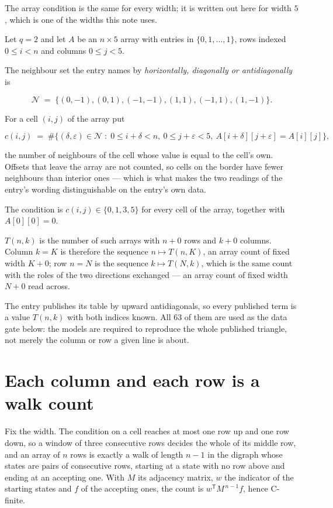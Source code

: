 \documentclass[11pt]{article}
\theoremstyle{definition}
\begin{document}
The array condition is the same for every width; it is written out here for width $5$, which is one of the widths this note uses.

Let $q = 2$ and let $A$ be an $n \times 5$ array with entries in $\{0,1,\dots,1\}$, rows indexed $0 \le i < n$ and columns $0 \le j < 5$.

The neighbour set the entry names by {\itshape horizontally, diagonally or antidiagonally} is

\[\mathcal{N} \;=\; \{(0,-1), (0,1), (-1,-1), (1,1), (-1,1), (1,-1)\}.\]

For a cell $(i,j)$ of the array put

\[c(i,j) \;=\; \#\bigl\{(\delta,\varepsilon)\in\mathcal{N} \;:\; 0\le i+\delta<n,\ 0\le j+\varepsilon<5,\ A[i+\delta][j+\varepsilon] = A[i][j]\bigr\},\]

the number of neighbours of the cell whose value is equal to the cell's own. Offsets that leave the array are not counted, so cells on the border have fewer neighbours than interior ones --- which is what makes the two readings of the entry's wording distinguishable on the entry's own data.

The condition is $c(i,j) \in \{0, 1, 3, 5\}$ for every cell of the array, together with $A[0][0]=0$.

$T(n,k)$ is the number of such arrays with $n + 0$ rows and $k + 0$ columns. Column $k = K$ is therefore the sequence $n \mapsto T(n,K)$, an array count of fixed width $K + 0$; row $n = N$ is the sequence $k \mapsto T(N,k)$, which is the same count with the roles of the two directions exchanged --- an array count of fixed width $N + 0$ read across.

The entry publishes its table by upward antidiagonals, so every published term is a value $T(n,k)$ with both indices known. All 63 of them are used as the data gate below: the models are required to reproduce the whole published triangle, not merely the column or row a given line is about.

\section{Each column and each row is a walk count}

Fix the width. The condition on a cell reaches at most one row up and one row down, so a window of three consecutive rows decides the whole of its middle row, and an array of $n$ rows is exactly a walk of length $n-1$ in the digraph whose states are pairs of consecutive rows, starting at a state with no row above and ending at an accepting one. With $M$ its adjacency matrix, $w$ the indicator of the starting states and $f$ of the accepting ones, the count is $w^{\mathsf T}M^{\,n-1}f$, hence C-finite.
\end{document}
